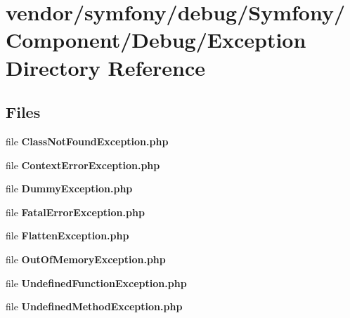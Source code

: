 \section{vendor/symfony/debug/\+Symfony/\+Component/\+Debug/\+Exception Directory Reference}
\label{dir_bf358dafbcb73b373b823593d9f448c0}
\subsection*{Files}
\begin{DoxyCompactItemize}
\item 
file {\bf Class\+Not\+Found\+Exception.\+php}
\item 
file {\bf Context\+Error\+Exception.\+php}
\item 
file {\bf Dummy\+Exception.\+php}
\item 
file {\bf Fatal\+Error\+Exception.\+php}
\item 
file {\bf Flatten\+Exception.\+php}
\item 
file {\bf Out\+Of\+Memory\+Exception.\+php}
\item 
file {\bf Undefined\+Function\+Exception.\+php}
\item 
file {\bf Undefined\+Method\+Exception.\+php}
\end{DoxyCompactItemize}
